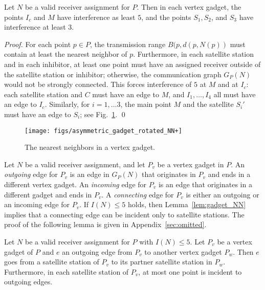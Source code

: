 \documentclass[envcountsect,envcountsame,runningheads,a4paper]{llncs}
\begin{document}
\begin{lemma}
\label{lem:gadget_NN}
Let $N$ be a valid receiver assignment for $P$.
Then in each vertex gadget, the points $I_c$ and $M$
have interference as least $5$,
and the points $S_1, S_2$, and $S_3$ have interference at
least $3$.
\end{lemma}

\begin{proof}
For each point $p \in P$, the transmission
range $B(p, d(p, N(p))$ must contain
at least the nearest
neighbor of $p$. Furthermore, in each
satellite station and in each inhibitor,
at least one point must have an assigned receiver outside
of the satellite station or inhibitor; otherwise,
the communication graph $G_P(N)$ would not be strongly connected.
This forces interference of $5$ at $M$ and at $I_c$: each satellite
station and $C$ must have
an edge to $M$, and $I_1, \dots, I_4$ all must have an
edge to $I_c$. Similarly, for $i = 1, \dots 3$, the main
point $M$ and the satellite $S_i'$ must have an edge to $S_i$;
see Fig.~\ref{fig:gadget_NN+}.
\qed{}
\end{proof}


\begin{figure}[htbp]
  \centering
  \texttt{[image: figs/asymmetric\_gadget\_rotated\_NN+]}
  \caption{The nearest
    neighbors in a vertex gadget. }
  \label{fig:gadget_NN+}
\end{figure}

Let $N$ be a valid receiver assignment,  and
let $P_v$ be a vertex gadget in $P$. An \emph{outgoing}
edge for $P_v$ is an edge in $G_P(N)$ that originates
in $P_v$ and ends in a different vertex gadget.
An \emph{incoming} edge for $P_v$ is an edge that
originates in a different gadget and ends in $P_v$.
A \emph{connecting} edge for $P_v$ is either an outgoing
or an incoming edge for $P_v$. If $I(N) \leq 5$ holds, then
Lemma~\ref{lem:gadget_NN} implies that a connecting
edge can be incident only to satellite
stations. The proof of the following lemma is given in Appendix~\ref{sec:omitted}.

\begin{lemma}\label{lem:outedge}
Let $N$ be a valid receiver assignment for $P$
with $I(N) \leq 5$.
Let $P_v$ be a vertex gadget of $P$ and
$e$ an outgoing edge from $P_v$
to another vertex gadget $P_w$.
Then $e$ goes from a satellite station of $P_v$ to
its partner satellite station in $P_w$.
Furthermore, in each satellite station of $P_v$,
at most one point is incident to outgoing edges.
\end{lemma}
\end{document}
